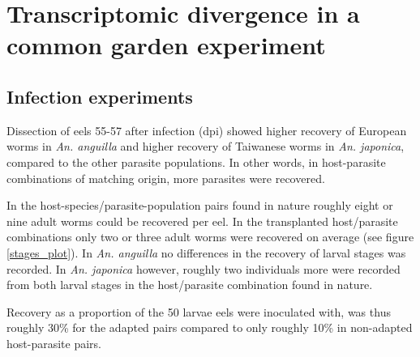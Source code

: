 
\chapter{Transcriptomic divergence in a common garden experiment}
\label{cha:tra-diff}


\ifpdf
    \graphicspath{{6_rna_seq/figures/PNG/}{6_rna_seq/figures/PDF/}{6_rna_seq/figures/}}
\else
    \graphicspath{{6_rna_seq/figures/EPS/}{6_rna_seq/figures/}}
\fi




\section{Infection experiments}

Dissection of eels 55-57 after infection (dpi) showed higher recovery
of European worms in \textit{An. anguilla} and higher recovery of
Taiwanese worms in \textit{An. japonica}, compared to the other
parasite populations. In other words, in host-parasite combinations of
matching origin, more parasites were recovered.


In the host-species/parasite-population pairs found in nature roughly
eight or nine adult worms could be recovered per eel. In the
transplanted host/parasite combinations only two or three adult worms
were recovered on average (see figure \ref{stages_plot}). In
\textit{An. anguilla} no differences in the recovery of larval stages
was recorded. In \textit{An. japonica} however, roughly two
individuals more were recorded from both larval stages in the
host/parasite combination found in nature.

Recovery as a proportion of the 50 larvae eels were inoculated with,
was thus roughly 30\% for the adapted pairs compared to only roughly
10\% in non-adapted host-parasite pairs.

